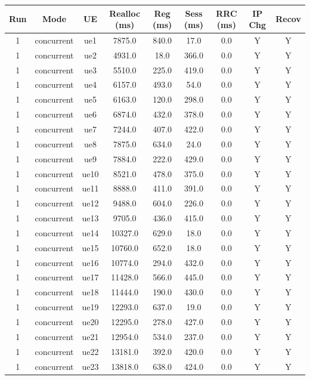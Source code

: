 \begin{table}[ht]
\centering
\begin{tabular}{|c|c|c|c|c|c|c|c|c|}
\hline
Run & Mode & UE & Realloc (ms) & Reg (ms) & Sess (ms) & RRC (ms) & IP Chg & Recov \\
\hline
1 & concurrent & ue1 & 7875.0 & 840.0 & 17.0 & 0.0 & Y & Y \\
1 & concurrent & ue2 & 4931.0 & 18.0 & 366.0 & 0.0 & Y & Y \\
1 & concurrent & ue3 & 5510.0 & 225.0 & 419.0 & 0.0 & Y & Y \\
1 & concurrent & ue4 & 6157.0 & 493.0 & 54.0 & 0.0 & Y & Y \\
1 & concurrent & ue5 & 6163.0 & 120.0 & 298.0 & 0.0 & Y & Y \\
1 & concurrent & ue6 & 6874.0 & 432.0 & 378.0 & 0.0 & Y & Y \\
1 & concurrent & ue7 & 7244.0 & 407.0 & 422.0 & 0.0 & Y & Y \\
1 & concurrent & ue8 & 7875.0 & 634.0 & 24.0 & 0.0 & Y & Y \\
1 & concurrent & ue9 & 7884.0 & 222.0 & 429.0 & 0.0 & Y & Y \\
1 & concurrent & ue10 & 8521.0 & 478.0 & 375.0 & 0.0 & Y & Y \\
1 & concurrent & ue11 & 8888.0 & 411.0 & 391.0 & 0.0 & Y & Y \\
1 & concurrent & ue12 & 9488.0 & 604.0 & 226.0 & 0.0 & Y & Y \\
1 & concurrent & ue13 & 9705.0 & 436.0 & 415.0 & 0.0 & Y & Y \\
1 & concurrent & ue14 & 10327.0 & 629.0 & 18.0 & 0.0 & Y & Y \\
1 & concurrent & ue15 & 10760.0 & 652.0 & 18.0 & 0.0 & Y & Y \\
1 & concurrent & ue16 & 10774.0 & 294.0 & 432.0 & 0.0 & Y & Y \\
1 & concurrent & ue17 & 11428.0 & 566.0 & 445.0 & 0.0 & Y & Y \\
1 & concurrent & ue18 & 11444.0 & 190.0 & 430.0 & 0.0 & Y & Y \\
1 & concurrent & ue19 & 12293.0 & 637.0 & 19.0 & 0.0 & Y & Y \\
1 & concurrent & ue20 & 12295.0 & 278.0 & 427.0 & 0.0 & Y & Y \\
1 & concurrent & ue21 & 12954.0 & 534.0 & 237.0 & 0.0 & Y & Y \\
1 & concurrent & ue22 & 13181.0 & 392.0 & 420.0 & 0.0 & Y & Y \\
1 & concurrent & ue23 & 13818.0 & 638.0 & 424.0 & 0.0 & Y & Y \\

\end{tabular}
\end{table}
